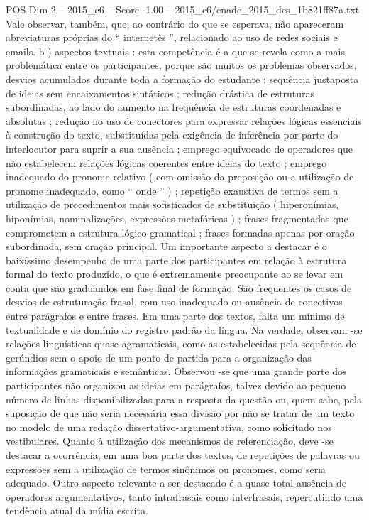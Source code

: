 \begin{textsample}{POS Dim 2 – 2015\_c6 – Score -1.00 – 2015\_c6/enade\_2015\_des\_1b821ff87a.txt}
Vale observar, também, que, ao contrário do que se esperava, não apareceram abreviaturas próprias do “ internetês ”, relacionado ao uso de redes sociais e emails. b ) aspectos textuais : esta competência é a que se revela como a mais problemática entre os participantes, porque são muitos os problemas observados, desvios acumulados durante toda a formação do estudante : sequência justaposta de ideias sem encaixamentos sintáticos ; redução drástica de estruturas subordinadas, ao lado do aumento na frequência de estruturas coordenadas e absolutas ; redução no uso de conectores para expressar relações lógicas essenciais à construção do texto, substituídas pela exigência de inferência por parte do interlocutor para suprir a sua ausência ; emprego equivocado de operadores que não estabelecem relações lógicas coerentes entre ideias do texto ; emprego inadequado do pronome relativo ( com omissão da preposição ou a utilização de pronome inadequado, como “ onde ” ) ; repetição exaustiva de termos sem a utilização de procedimentos mais sofisticados de substituição ( hiperonímias, hiponímias, nominalizações, expressões metafóricas ) ; frases fragmentadas que comprometem a estrutura lógico-gramatical ; frases formadas apenas por oração subordinada, sem oração principal.
Um importante aspecto a destacar é o baixíssimo desempenho de uma parte dos participantes em relação à estrutura formal do texto produzido, o que é extremamente preocupante ao se levar em conta que são graduandos em fase final de formação.
São frequentes os casos de desvios de estruturação frasal, com uso inadequado ou ausência de conectivos entre parágrafos e entre frases.
Em uma parte dos textos, falta um mínimo de textualidade e de domínio do registro padrão da língua.
Na verdade, observam -se relações linguísticas quase agramaticais, como as estabelecidas pela sequência de gerúndios sem o apoio de um ponto de partida para a organização das informações gramaticais e semânticas.
Observou -se que uma grande parte dos participantes não organizou as ideias em parágrafos, talvez devido ao pequeno número de linhas disponibilizadas para a resposta da questão ou, quem sabe, pela suposição de que não seria necessária essa divisão por não se tratar de um texto no modelo de uma redação dissertativo-argumentativa, como solicitado nos vestibulares.
Quanto à utilização dos mecanismos de referenciação, deve -se destacar a ocorrência, em uma boa parte dos textos, de repetições de palavras ou expressões sem a utilização de termos sinônimos ou pronomes, como seria adequado.
Outro aspecto relevante a ser destacado é a quase total ausência de operadores argumentativos, tanto intrafrasais como interfrasais, repercutindo uma tendência atual da mídia escrita.

\end{textsample}
